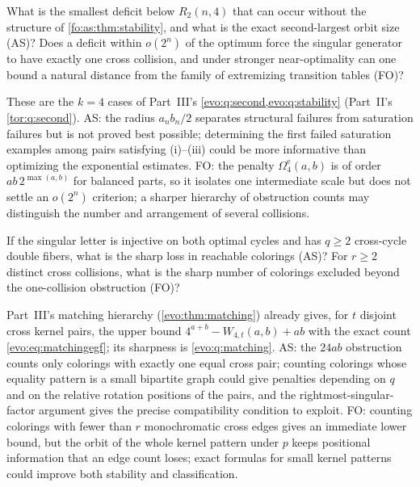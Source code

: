 \documentclass[11pt,a4paper]{article}
\numberwithin{equation}{section}
\theoremstyle{definition}
\theoremstyle{remark}
\begin{document}
\begin{question}\label{fo:q:stability}
What is the smallest deficit below $R_2(n,4)$ that can occur without the
structure of \cref{fo:as:thm:stability}, and what is the exact second-largest
orbit size (AS)? Does a deficit within $o(2^n)$ of the optimum force the
singular generator to have exactly one cross collision, and under stronger
near-optimality can one bound a natural distance from the family of
extremizing transition tables (FO)?
\end{question}
These are the $k=4$ cases of Part~III's \cref{evo:q:second,evo:q:stability}
(Part~II's \cref{tor:q:second}). AS: the radius $a_nb_n/2$ separates structural
failures from saturation failures but is not proved best possible;
determining the first failed saturation examples among pairs satisfying
(i)--(iii) could be more informative than optimizing the exponential
estimates. FO: the penalty $\Omega^{\mathrm e}_4(a,b)$ is of order
$ab\,2^{\max(a,b)}$ for balanced parts, so it isolates one intermediate scale
but does not settle an $o(2^n)$ criterion; a sharper hierarchy of obstruction
counts may distinguish the number and arrangement of several collisions.

\begin{question}\label{fo:q:collisions}
If the singular letter is injective on both optimal cycles and has $q\ge2$
cross-cycle double fibers, what is the sharp loss in reachable colorings (AS)?
For $r\ge2$ distinct cross collisions, what is the sharp number of colorings
excluded beyond the one-collision obstruction (FO)?
\end{question}
Part~III's matching hierarchy (\cref{evo:thm:matching}) already gives, for $t$
disjoint cross kernel pairs, the upper bound $4^{a+b}-W_{4,t}(a,b)+ab$ with the
exact count \eqref{evo:eq:matchingegf}; its sharpness is \cref{evo:q:matching}.
AS: the $24ab$ obstruction counts only colorings with exactly one equal cross
pair; counting colorings whose equality pattern is a small bipartite graph
could give penalties depending on $q$ and on the relative rotation positions
of the pairs, and the rightmost-singular-factor argument gives the precise
compatibility condition to exploit. FO: counting colorings with fewer than $r$
monochromatic cross edges gives an immediate lower bound, but the orbit of the
whole kernel pattern under $p$ keeps positional information that an edge count
loses; exact formulas for small kernel patterns could improve both stability
and classification.
\end{document}
